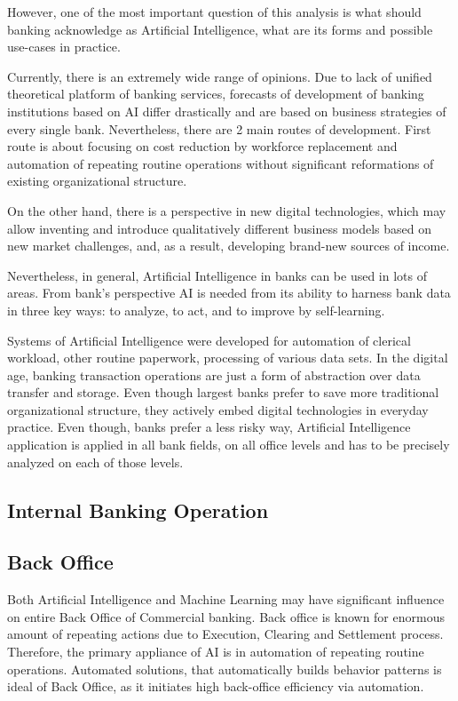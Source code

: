 However, one of the most important question of this analysis is what should banking acknowledge as Artificial Intelligence, what are its forms and possible use-cases in practice.

Currently, there is an extremely wide range of opinions.
Due to lack of unified theoretical platform of banking services, forecasts of development of banking institutions based on AI differ drastically and are based on business strategies of every single bank.
Nevertheless, there are 2 main routes of development.
First route is about focusing on cost reduction by workforce replacement and automation of repeating routine operations without significant reformations of existing organizational structure.

On the other hand, there is a perspective in new digital technologies, which may allow inventing and introduce qualitatively different business models based on new market challenges, and, as a result, developing brand-new sources of income.
\cite{ai_reality_hype}

Nevertheless, in general, Artificial Intelligence in banks can be used in lots of areas.
From bank's perspective AI is needed from its ability to harness bank data in three key ways: to analyze, to act, and to improve by self-learning.

Systems of Artificial Intelligence were developed for automation of clerical workload, other routine paperwork, processing of various data sets.
In the digital age, banking transaction operations are just a form of abstraction over data transfer and storage.
Even though largest banks prefer to save more traditional organizational structure, they actively embed digital technologies in everyday practice.
Even though, banks prefer a less risky way, Artificial Intelligence application is applied in all bank fields, on all office levels and has to be precisely analyzed on each of those levels.



\subsection{Internal Banking Operation}

\subsection*{Back Office}

Both Artificial Intelligence and Machine Learning may have significant influence on entire Back Office of Commercial banking.
Back office is known for enormous amount of repeating actions due to Execution, Clearing and Settlement process.
Therefore, the primary appliance of AI is in automation of repeating routine operations.
Automated solutions, that automatically builds behavior patterns is ideal of Back Office, as it initiates high back-office efficiency via automation.

